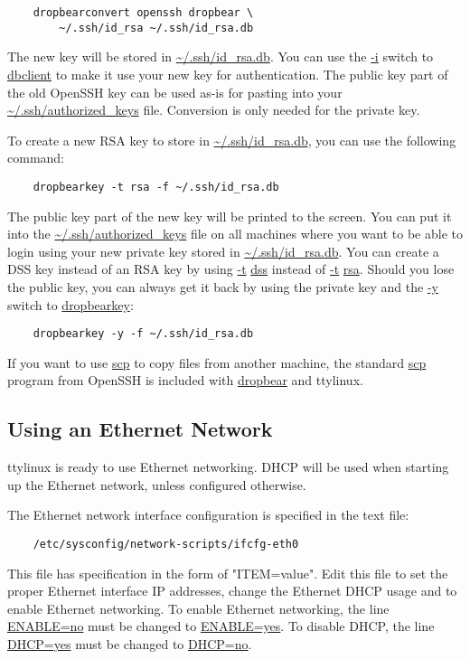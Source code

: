 \documentclass[10pt]{article}
\begin{document}
\begin{lstlisting}
	dropbearconvert openssh dropbear \
		~/.ssh/id_rsa ~/.ssh/id_rsa.db
\end{lstlisting}

The new key will be stored in \url{~/.ssh/id_rsa.db}. You can use the \url{-i}
switch to \url{dbclient} to make it use your new key for authentication. The
public key part of the old OpenSSH key can be used as-is for pasting into your
\url{~/.ssh/authorized_keys} file. Conversion is only needed for the private
key.

To create a new RSA key to store in \url{~/.ssh/id_rsa.db}, you can use the
following command:

\begin{lstlisting}
	dropbearkey -t rsa -f ~/.ssh/id_rsa.db
\end{lstlisting}

The public key part of the new key will be printed to the screen. You can put
it into the \url{~/.ssh/authorized_keys} file on all machines where you want to
be able to login using your new private key stored in \url{~/.ssh/id_rsa.db}.
You can create a DSS key instead of an RSA key by using \url{-t} \url{dss}
instead of \url{-t} \url{rsa}. Should you lose the public key, you can always
get it back by using the private key and the \url{-y} switch to
\url{dropbearkey}:

\begin{lstlisting}
	dropbearkey -y -f ~/.ssh/id_rsa.db
\end{lstlisting}

If you want to use \url{scp} to copy files from another machine, the standard
\url{scp} program from OpenSSH is included with \url{dropbear} and ttylinux.

\subsection{Using an Ethernet Network}

ttylinux is ready to use Ethernet networking. DHCP will be used when starting
up the Ethernet network, unless configured otherwise.

The Ethernet network interface configuration is specified in the text file:
\begin{lstlisting}
	/etc/sysconfig/network-scripts/ifcfg-eth0
\end{lstlisting}

This file has specification in the form of "ITEM=value". Edit this file to set
the proper Ethernet interface IP addresses, change the Ethernet DHCP usage and
to enable Ethernet networking. To enable Ethernet networking, the line
\url{ENABLE=no} must be changed to \url{ENABLE=yes}. To disable DHCP, the line
\url{DHCP=yes} must be changed to \url{DHCP=no}.
\end{document}
